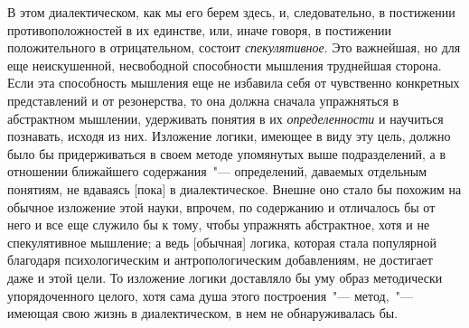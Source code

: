 В этом диалектическом, как мы его берем здесь, и,
следовательно, в постижении противоположностей в их
единстве, или, иначе говоря, в постижении положительного
в отрицательном, состоит \emph{спекулятивное}. Это важнейшая,
но для еще неискушенной, несвободной способности
мышления труднейшая сторона. Если эта способность
мышления еще не избавила себя от чувственно
конкретных представлений и от резонерства, то она должна
сначала упражняться в абстрактном мышлении,
удерживать понятия в их \emph{определенности} и научиться
познавать, исходя из них. Изложение логики, имеющее
в виду эту цель, должно было бы придерживаться в своем
методе упомянутых выше подразделений, а в отношении
ближайшего содержания~"--- определений, даваемых отдельным
понятиям, не вдаваясь [пока] в диалектическое.
Внешне оно стало бы похожим на обычное изложение
этой науки, впрочем, по содержанию и отличалось бы от
него и все еще служило бы к тому, чтобы упражнять
абстрактное, хотя и не спекулятивное мышление; а ведь
[обычная] логика, которая стала популярной благодаря
психологическим и антропологическим добавлениям, не
достигает даже и этой цели. То изложение логики доставляло
бы уму образ методически упорядоченного целого,
хотя сама душа этого построения~"--- метод,~"--- имеющая
свою жизнь в диалектическом, в нем не обнаруживалась
бы.

